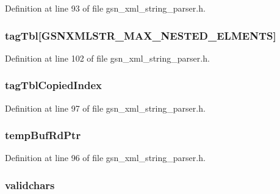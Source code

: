 Definition at line 93 of file gsn\_\-xml\_\-string\_\-parser.h.

\hypertarget{a00444_a949468a32ac941964649a382ea7e2d4c}{
\subsubsection[{tagTbl}]{ {\bf tagTbl}\mbox{[}GSNXMLSTR\_\-MAX\_\-NESTED\_\-ELMENTS\mbox{]}}}
\label{a00444_a949468a32ac941964649a382ea7e2d4c}


Definition at line 102 of file gsn\_\-xml\_\-string\_\-parser.h.

\hypertarget{a00444_a18a691285c94ec64a67d3c0ec6b03a74}{
\subsubsection[{tagTblCopiedIndex}]{ {\bf tagTblCopiedIndex}}}
\label{a00444_a18a691285c94ec64a67d3c0ec6b03a74}


Definition at line 97 of file gsn\_\-xml\_\-string\_\-parser.h.

\hypertarget{a00444_a6b5660b20189e02a301bfd0f04ad45f3}{
\subsubsection[{tempBufRdPtr}]{ {\bf tempBufRdPtr}}}
\label{a00444_a6b5660b20189e02a301bfd0f04ad45f3}


Definition at line 96 of file gsn\_\-xml\_\-string\_\-parser.h.

\hypertarget{a00444_ab3f500e5a0f070b238e5dbde5f53e27e}{
\subsubsection[{validchars}]{ {\bf validchars}}}
\label{a00444_ab3f500e5a0f070b238e5dbde5f53e27e}


